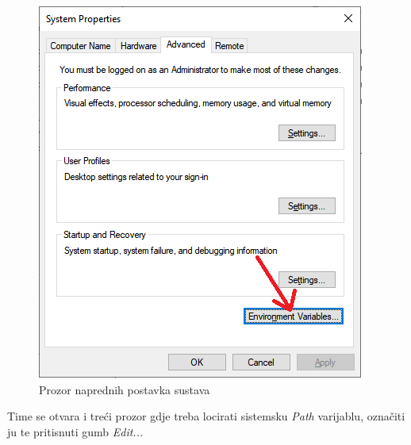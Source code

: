 			\begin{figure}[H]
			\centering
			\includegraphics[width=\textwidth, scale=0.5]{slike/SystemPropertiesAdvanced}
			\caption{Prozor naprednih postavka sustava}
			\label{fig:SystemPropertiesAdvanced}
			\end{figure}
			
			\eject
			Time se otvara i treći prozor gdje treba locirati sistemsku \textit{Path} varijablu, označiti ju te pritisnuti gumb \textit{Edit...}
			
